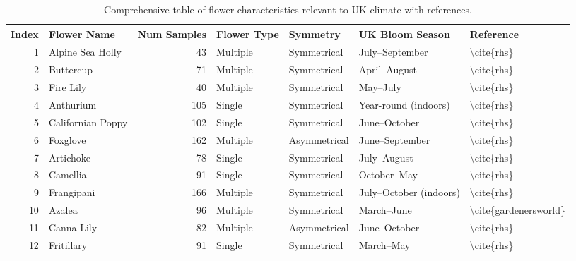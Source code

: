 \begin{table}
\centering
\caption{Comprehensive table of flower characteristics relevant to UK climate with references.}
\label{tab:uk_flower_data_complete}
\begin{tabular}{rlrllll}
\toprule
 Index &               Flower Name &  Num Samples & Flower Type &     Symmetry &          UK Bloom Season &               Reference \\
\midrule
     1 &          Alpine Sea Holly &           43 &    Multiple &  Symmetrical &           July–September &              \textbackslash cite\{rhs\} \\
     2 &                 Buttercup &           71 &    Multiple &  Symmetrical &             April–August &              \textbackslash cite\{rhs\} \\
     3 &                 Fire Lily &           40 &    Multiple &  Symmetrical &                 May–July &              \textbackslash cite\{rhs\} \\
     4 &                 Anthurium &          105 &      Single &  Symmetrical &     Year-round (indoors) &              \textbackslash cite\{rhs\} \\
     5 &         Californian Poppy &          102 &      Single &  Symmetrical &             June–October &              \textbackslash cite\{rhs\} \\
     6 &                  Foxglove &          162 &    Multiple & Asymmetrical &           June–September &              \textbackslash cite\{rhs\} \\
     7 &                 Artichoke &           78 &      Single &  Symmetrical &              July–August &              \textbackslash cite\{rhs\} \\
     8 &                  Camellia &           91 &      Single &  Symmetrical &              October–May &              \textbackslash cite\{rhs\} \\
     9 &                Frangipani &          166 &    Multiple &  Symmetrical &   July–October (indoors) &              \textbackslash cite\{rhs\} \\
    10 &                    Azalea &           96 &    Multiple &  Symmetrical &               March–June &   \textbackslash cite\{gardenersworld\} \\
    11 &                Canna Lily &           82 &    Multiple & Asymmetrical &             June–October &              \textbackslash cite\{rhs\} \\
    12 &                Fritillary &           91 &      Single &  Symmetrical &                March–May &              \textbackslash cite\{rhs\} \\

\end{tabular}
\end{table}
